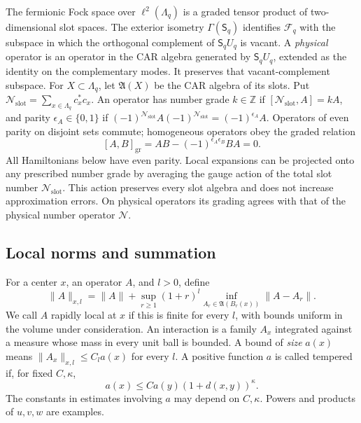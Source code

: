 The fermionic Fock space over $\ell^2(\Lambda_q)$ is a graded tensor
product of two-dimensional slot spaces.  The exterior isometry
$\Gamma(\mathsf S_q)$ identifies $\mathcal F_q$ with the subspace in which
the orthogonal complement of $\mathsf S_qU_q$ is vacant.  A \emph{physical}
operator is an operator in the CAR algebra generated by $\mathsf S_qU_q$,
extended as the identity on the complementary modes.  It preserves
that vacant-complement subspace.  For $X\subset\Lambda_q$, let
$\mathfrak A(X)$ be the CAR algebra of its slots.  Put
$\mathcal N_{\mathrm{slot}}=\sum_{x\in\Lambda_q}c_x^*c_x$.
An operator has number grade $k\in\mathbb Z$ if
$[\mathcal N_{\mathrm{slot}},A]=kA$, and parity
$\epsilon_A\in\{0,1\}$ if
$(-1)^{\mathcal N_{\mathrm{slot}}}A(-1)^{\mathcal N_{\mathrm{slot}}}
=(-1)^{\epsilon_A}A$.  Operators of even parity on disjoint sets
commute; homogeneous operators obey the
graded relation
\[
 [A,B]_{\mathrm{gr}}=AB-(-1)^{\epsilon_A\epsilon_B}BA=0.
\]
All Hamiltonians below have even parity.  Local expansions can be
projected onto any prescribed number grade by averaging the gauge
action of the total slot number $\mathcal N_{\mathrm{slot}}$.
This action preserves every slot algebra and does not increase
approximation errors.  On physical operators its grading agrees with
that of the physical number operator $\mathcal N$.

\subsection{Local norms and summation}

For a center $x$, an operator $A$, and $l>0$, define
\begin{equation}
 \|A\|_{x,l}=\|A\|+
 \sup_{r\geq1}(1+r)^l
       \inf_{A_r\in\mathfrak A(B_r(x))}\|A-A_r\|.
 \label{locality:ball-norm}
\end{equation}
We call $A$ rapidly local at $x$ if this is finite for every $l$,
with bounds uniform in the volume under consideration.  An interaction
is a family $A_x$ integrated against a measure whose mass in every
unit ball is bounded.  A bound of \emph{size} $a(x)$ means
$\|A_x\|_{x,l}\leq C_l a(x)$ for every $l$.  A positive function $a$
is called tempered if, for fixed $C,\kappa$,
\begin{equation}
 a(x)\leq C a(y)(1+d(x,y))^\kappa.
 \label{eq:tempered-weight}
\end{equation}
The constants in estimates involving $a$ may depend on $C,\kappa$.
Powers and products of $u,v,w$ are examples.

